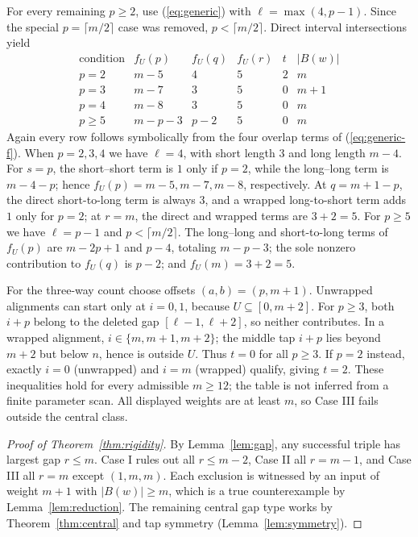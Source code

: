 \documentclass[11pt,a4paper]{article}
\newcommand{\wt}[1]{\lvert #1\rvert}
\begin{document}
For every remaining $p\ge2$, use (\ref{eq:generic}) with $\ell=\max(4,p-1)$. Since the special $p=\lceil m/2\rceil$ case was removed, $p<\lceil m/2\rceil$. Direct interval intersections yield
\begin{equation}\label{eq:caseIII-tab}
\begin{array}{c|ccccc}
\text{condition}&f_U(p)&f_U(q)&f_U(r)&t&\wt{B(w)}\\\hline
p=2&m-5&4&5&2&m\\
p=3&m-7&3&5&0&m+1\\
p=4&m-8&3&5&0&m\\
p\ge5&m-p-3&p-2&5&0&m
\end{array}
\end{equation}
Again every row follows symbolically from the four overlap terms of (\ref{eq:generic-f}). When $p=2,3,4$ we have $\ell=4$, with short length $3$ and long length $m-4$. For $s=p$, the short--short term is $1$ only if $p=2$, while the long--long term is $m-4-p$; hence $f_U(p)=m-5,m-7,m-8$, respectively. At $q=m+1-p$, the direct short-to-long term is always $3$, and a wrapped long-to-short term adds $1$ only for $p=2$; at $r=m$, the direct and wrapped terms are $3+2=5$. For $p\ge5$ we have $\ell=p-1$ and $p<\lceil m/2\rceil$. The long--long and short-to-long terms of $f_U(p)$ are $m-2p+1$ and $p-4$, totaling $m-p-3$; the sole nonzero contribution to $f_U(q)$ is $p-2$; and $f_U(m)=3+2=5$.

For the three-way count choose offsets $(a,b)=(p,m+1)$. Unwrapped alignments can start only at $i=0,1$, because $U\subseteq[0,m+2]$. For $p\ge3$, both $i+p$ belong to the deleted gap $[\ell-1,\ell+2]$, so neither contributes. In a wrapped alignment, $i\in\{m,m+1,m+2\}$; the middle tap $i+p$ lies beyond $m+2$ but below $n$, hence is outside $U$. Thus $t=0$ for all $p\ge3$. If $p=2$ instead, exactly $i=0$ (unwrapped) and $i=m$ (wrapped) qualify, giving $t=2$. These inequalities hold for every admissible $m\ge12$; the table is not inferred from a finite parameter scan. All displayed weights are at least $m$, so Case III fails outside the central class.

\begin{proof}[Proof of Theorem~\ref{thm:rigidity}]
By Lemma~\ref{lem:gap}, any successful triple has largest gap $r\le m$. Case I rules out all $r\le m-2$, Case II all $r=m-1$, and Case III all $r=m$ except $(1,m,m)$. Each exclusion is witnessed by an input of weight $m+1$ with $\wt{B(w)}\ge m$, which is a true counterexample by Lemma~\ref{lem:reduction}. The remaining central gap type works by Theorem~\ref{thm:central} and tap symmetry (Lemma~\ref{lem:symmetry}).
\end{proof}
\end{document}
